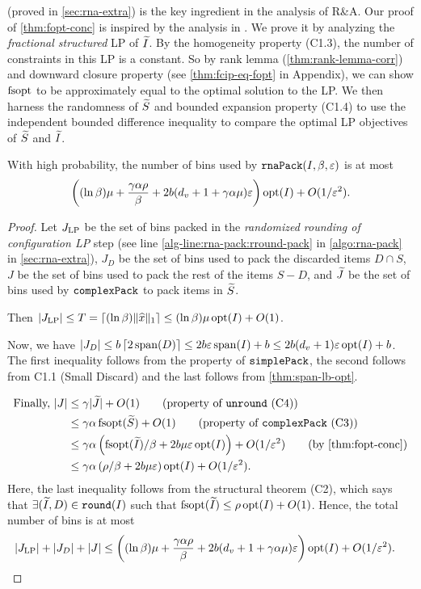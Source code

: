  (proved in \cref{sec:rna-extra})
is the key ingredient in the analysis of R\&A.
Our proof of \cref{thm:fopt-conc} is inspired by the analysis in \cite{khan-thesis}.
We prove it by analyzing the \emph{fractional structured} \config{} LP of $\widetilde{I}$.
By the homogeneity property (C1.3), the number of constraints in this LP is a constant.
So by rank lemma (\cref{thm:rank-lemma-corr}) and downward closure
property (see \cref{thm:fcip-eq-fopt} in Appendix), we can show
$\operatorname{fsopt}$ to be approximately equal to the optimal solution to the LP.
We then harness the randomness of $\widetilde{S}$ and bounded expansion
property (C1.4) to use the
independent bounded difference inequality \cite{mcdiarmid1989method}
to compare the optimal LP objectives of $\widetilde{S}$ and $\widetilde{I}$.

\begin{theorem}
\label{thm:rna-pack}
With high probability, the number of bins used by $\operatorname{\mathtt{rnaPack}}(I, \beta, \varepsilon)$ is at most
\[ \left( (\ln\beta)\mu + \frac{\gamma\alpha\rho}{\beta}
    + 2b(d_v+1+\gamma\alpha\mu)\varepsilon \right) \operatorname{opt}(I) + O(1/\varepsilon^2). \]
\end{theorem}
\begin{proof}
Let $J_{\operatorname{LP}}$ be the set of bins packed in the {\em randomized rounding of
configuration LP} step
(see line \ref{alg-line:rna-pack:rround-pack} in \cref{algo:rna-pack}
in \cref{sec:rna-extra}),
$J_D$ be the set of bins used to pack the discarded items $D \cap S$,
$J$ be the set of bins used to pack the rest of the items $S - D$,
and $\widetilde{J}$ be the set of bins used by $\operatorname{\mathtt{complexPack}}$ to pack items in $\widetilde{S}$.

Then $|J_{\operatorname{LP}}| \le T = \lceil (\ln\beta)\lVert \widehat{x} \rVert_1 \rceil \le (\ln\beta)\mu\operatorname{opt}(I) + O(1)$.

Now, we have $|J_D| \le b\left\lceil 2\operatorname{span}(D) \right\rceil \le 2b\varepsilon\operatorname{span}(I) + b \le 2b(d_v+1)\varepsilon\operatorname{opt}(I) + b$.
The first inequality follows from the property of $\operatorname{\mathtt{simplePack}}$, the second follows from
C1.1 (Small Discard) and the last follows from \cref{thm:span-lb-opt}.

\begin{align*}
\text{Finally, } |J| &\le \gamma|\Jtild| + O(1)  \tag{property of $\unround$ (C4)}
\\ &\le \gamma\alpha\fsopt(\Stild) + O(1)  \tag{property of $\complexPack$ (C3)}
\\ &\le \gamma\alpha\left( {\fsopt(\Itild)}/{\beta} + 2b\mu\eps\opt(I) \right) + O(1/\eps^2)
    \tag{by \cref{thm:fopt-conc}}
\\ &\le \gamma\alpha\left(\rho/\beta + 2b\mu\eps\right)\opt(I) + O(1/\eps^2).
\end{align*}
Here, the last inequality follows from the structural theorem (C2),
which says that $\exists (\widetilde{I}, D) \in \operatorname{\mathtt{round}}(I)$ such that
$\operatorname{fsopt}(\widetilde{I}) \le \rho\operatorname{opt}(I) + O(1)$.
Hence, the total number of bins is at most
\begin{align*}
& |J_{\operatorname{LP}}| + |J_D| + |J|
\le \left( (\ln\beta)\mu + \frac{\gamma\alpha\rho}{\beta}
    + 2b(d_v+1+\gamma\alpha\mu)\varepsilon \right)\operatorname{opt}(I) + O(1/\varepsilon^2).
\qedhere \end{align*}
\end{proof}

